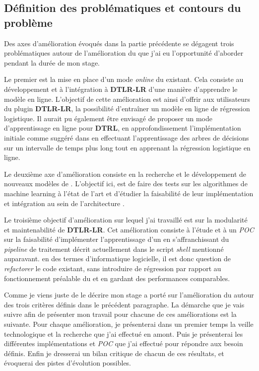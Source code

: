     \subsection{Définition des problématiques et contours du problème}
        Des axes d'amélioration évoqués dans la partie précédente se dégagent trois problématiques autour de l'amélioration du \bo que j'ai eu l'opportunité d'aborder pendant la durée de mon stage. \par 
        Le premier est la mise en place d'un mode \emph{online} du \bo existant. Cela consiste au développement et à l'intégration à \textbf{DTLR-LR} d'une manière d'apprendre le modèle en ligne. L'objectif de cette amélioration est ainsi d'offrir aux utilisateurs du plugin \textbf{DTLR-LR}, la possibilité d'entraîner un modèle en ligne de régression logistique. Il aurait pu également être envisagé de proposer un mode d'apprentissage en ligne pour \textbf{DTRL}, en approfondissement l'implémentation initiale comme suggéré dans \cite{yi2013predictive} en effectuant l'apprentissage des arbres de décisions sur un intervalle de temps plus long tout en apprenant la régression logistique en ligne. \par
        Le deuxième axe d'amélioration consiste en la recherche et le développement de nouveaux modèles de \bo. L'objectif ici, est de faire des tests sur les algorithmes de machine learning à l'état de l'art et d'étudier la faisabilité de leur implémentation et intégration au sein de l'architecture \med. \par 
        Le troisième objectif d'amélioration sur lequel j'ai travaillé est sur la modularité et maintenabilité de \textbf{DTLR-LR}. Cet amélioration consiste à l'étude et à un \emph{POC} sur la faisabilité d'implémenter l'apprentissage d'un \bo en s'affranchissant du \emph{pipeline} de traitement décrit actuellement dans le script \emph{shell} mentionné auparavant. en des termes d'informatique logicielle, il est donc question de \emph{refactorer} le code existant, sans introduire de régression par rapport au fonctionnement préalable du \bo et en gardant des performances comparables. \newline \newline
    
    Comme je viens juste de le décrire mon stage a porté sur l'amélioration du \bo autour des trois critères définis dans le précédent paragraphe. La démarche que je vais suivre afin de présenter mon travail pour chacune de ces améliorations est la suivante. Pour chaque amélioration, je présenterai dans un premier temps la veille technologique et la recherche que j'ai effectué en amont. Puis je présenterai les différentes implémentations et \emph{POC} que j'ai effectué pour répondre aux besoin définis. Enfin je dresserai un bilan critique de chacun de ces résultats, et évoquerai des pistes d'évolution possibles.
        
